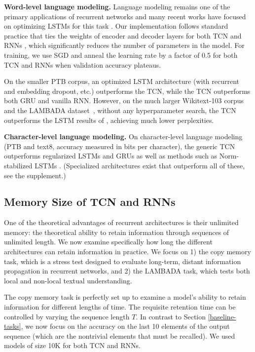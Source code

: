 \documentclass{article}
\newcommand\mypara[1]{\vspace{0mm}\noindent\textbf{#1}}
\begin{document}
\mypara{Word-level language modeling.}
Language modeling remains one of the primary applications of recurrent
networks and many recent works have focused on optimizing LSTMs for this
task \citep{kruegerZoneout,merityRegOpt}. Our implementation follows
standard practice that ties the weights of encoder and decoder
layers for both TCN and RNNs \citep{press2016using}, which significantly
reduces the number of parameters in the model. For training, we use SGD
and anneal the learning rate by a factor of 0.5 for both TCN and
RNNs when validation accuracy plateaus.

On the smaller PTB corpus, an optimized LSTM architecture (with recurrent
and embedding dropout, etc.) outperforms the TCN, while the TCN outperforms
both GRU and vanilla RNN. However, on the much larger Wikitext-103 corpus and
the LAMBADA dataset~\citep{paperno2016lambada}, without any hyperparameter search, the TCN outperforms the LSTM results of \citet{grave2016improving}, achieving much lower perplexities.

\mypara{Character-level language modeling.}
On character-level language modeling (PTB and text8, accuracy measured in
bits per character), the generic TCN outperforms regularized LSTMs and GRUs
as well as methods such as Norm-stabilized LSTMs \citep{krueger2015regularizing}.
(Specialized architectures exist that outperform all of these, see the
supplement.)

\subsection{Memory Size of TCN and RNNs}
\label{memsize-subsection}

One of the theoretical advantages of recurrent architectures is their unlimited memory: the theoretical ability to retain information through sequences of unlimited length. We now examine specifically how long the different architectures can retain information in practice. We focus on 1) the copy memory task, which is a stress test designed to evaluate long-term, distant information propagation in recurrent networks, and 2) the LAMBADA task, which tests both local and non-local textual understanding.

The copy memory task is perfectly set up to examine a model's ability to retain information for different lengths of time. The requisite retention time can be controlled by varying the sequence length $T$. In contrast to Section \ref{baseline-tasks}, we now focus on the accuracy on the last 10 elements of the output sequence (which are the nontrivial elements that must be recalled). We used models of size 10K for both TCN and RNNs.
\end{document}
